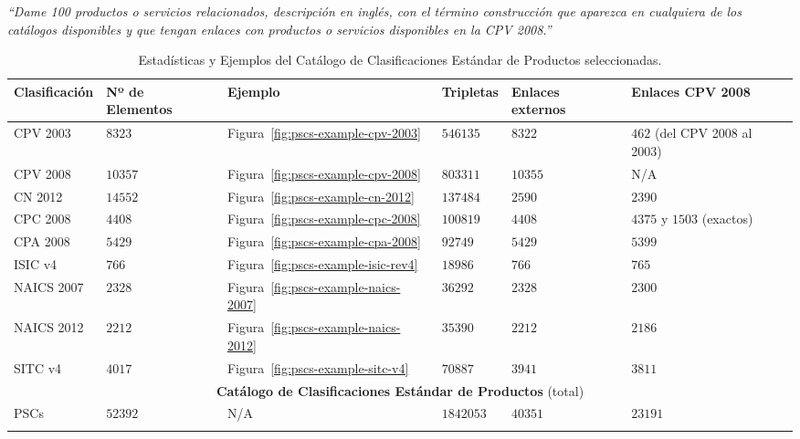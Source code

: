 \begin{Frame}
\textit{``Dame 100 productos o servicios relacionados, descripción en inglés, con el término construcción que aparezca en cualquiera de los catálogos disponibles y 
que tengan enlaces con productos o servicios disponibles en la CPV 2008.''}
\end{Frame}


\begin{longtable}[c]{|p{2.5cm}|p{2.5cm}|p{1.8cm}|p{1.8cm}|p{2.5cm}|p{2.5cm}|} 
\hline
  \textbf{Clasificación} & \textbf{Nº de Elementos}  &  \textbf{Ejemplo} &  \textbf{Tripletas} &  \textbf{Enlaces externos} &  \textbf{Enlaces CPV 2008} \\\hline
\endhead
\gls{CPV} 2003 & $8323$  & Figura~\ref{fig:pscs-example-cpv-2003}   & $546135$  & $8322$ & $462$ (del CPV 2008 al 2003)   \\ \hline
CPV 2008 & $10357$ &  Figura~\ref{fig:pscs-example-cpv-2008}   & $803311$  & $10355$ & N/A   \\ \hline
\gls{CN} 2012  & $14552$& Figura~\ref{fig:pscs-example-cn-2012}      & $137484$  & $2590$ & $2390$ \\ \hline
\gls{CPC} 2008 & $4408$&  Figura~\ref{fig:pscs-example-cpc-2008}    & $100819$  & $4408$ & $4375$ y $1503$ (exactos)  \\ \hline
\gls{CPA} 2008 & $5429$&  Figura~\ref{fig:pscs-example-cpa-2008}    & $92749$   & $5429$ & $5399$  \\ \hline
\gls{ISIC} v4  & $766$& Figura~\ref{fig:pscs-example-isic-rev4}    & $18986$   & $766$ & $765$  \\ \hline
\gls{NAICS} 2007 & $2328$& Figura~\ref{fig:pscs-example-naics-2007} & $36292$   & $2328$ & $2300$  \\ \hline
NAICS 2012 & $2212$& Figura~\ref{fig:pscs-example-naics-2012} & $35390$   & $2212$ & $2186$  \\ \hline
\gls{SITC} v4 & $4017$&  Figura~\ref{fig:pscs-example-sitc-v4}      & $70887$   & $3941$ & $3811$  \\ \hline
\multicolumn{6}{|c|}{\textbf{Catálogo de Clasificaciones Estándar de Productos} (total)} \\ \hline
PSCs & $52392$ &  N/A & $1842053$ & $40351$ & $23191$  \\ \hline
\hline
\caption{Estadísticas y Ejemplos del Catálogo de Clasificaciones Estándar de Productos seleccionadas.}\label{table:pscs-ejemplos}\\    
\end{longtable}

